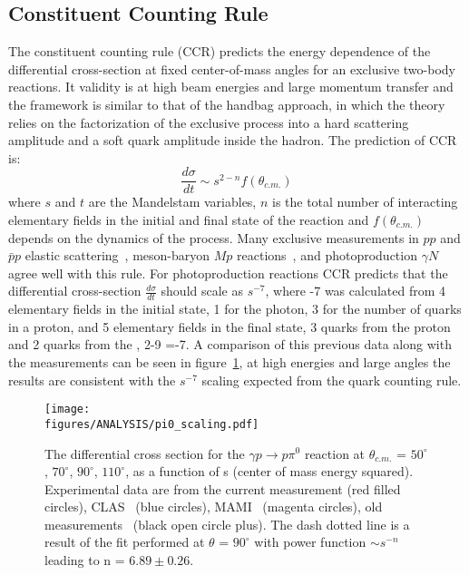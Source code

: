\subsection{Constituent Counting Rule}
	The constituent counting rule (CCR) predicts the energy dependence of the differential cross-section at fixed center-of-mass angles for an exclusive two-body reactions. It validity is at high beam energies and large momentum transfer and the framework is similar to that of the handbag approach, in which the theory relies on the factorization of the exclusive process into a hard scattering amplitude and a soft quark amplitude inside the hadron. The prediction of CCR is:
	\begin{equation}
		\frac{d\sigma}{dt} \sim s^{2-n}f(\theta_{c.m.}) \label{CCR}
	\end{equation}
	where $s$ and $t$ are the Mandelstam variables, $n$ is the total number of interacting elementary fields in the initial and final state of the reaction and $f(\theta_{c.m.})$ depends on the dynamics of the process. Many exclusive measurements in $pp$ and  $\bar{p}p$ elastic scattering~\cite{scalingexp5, scalingexp7}, meson-baryon $M p$ reactions~\cite{scalingexp7}, and photoproduction $\gamma N$~\cite{scalingexp2, scalingexp3, scalingexp4, scalingexp6, scalingexp8, scalingexp9, scalingexp10, scalingexp11} agree well with this rule. For \piz photoproduction reactions CCR predicts that the differential cross-section $\frac{d\sigma}{dt}$ should scale as $s^{-7}$, where -7 was calculated from 4 elementary fields in the initial state, 1 for the photon, 3 for the number of quarks in a proton, and 5 elementary fields in the final state, 3 quarks from the proton and  2 quarks from the \piz, 2-9 =-7. A comparison of this previous data along with the  measurements can be seen in figure~\ref{fig:pi0_scaling}, at high energies and large angles the results are consistent with the $s^{−7}$ scaling expected from the quark counting rule. 
	\begin{figure}[h]
		\centerline{\texttt{[image: \\figures/ANALYSIS/pi0\_scaling.pdf]}}
		\caption{The differential cross section for the $\gamma p \to p \pi^0$ reaction at $\theta_{c.m.}$ = $50^{\circ}$, $70^{\circ}$, $90^{\circ}$, $110^{\circ}$, as a function of s (center of mass energy squared). Experimental data are from the current measurement (red filled circles), CLAS~\protect\cite{Dugger07,Dugger13} (blue circles), MAMI~\protect\cite{beck} (magenta circles), old measurements~\protect\cite{Joos} (black open circle plus). The dash dotted line is a result of the fit performed at $\theta$ = $90^{\circ}$ with power function $\sim s^{−n}$ leading to n = $6.89 \pm 0.26$.}
		\label{fig:pi0_scaling}
	\end{figure}
	\FloatBarrier